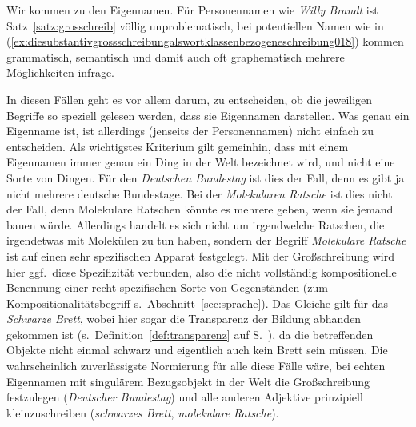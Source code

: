 Wir kommen zu den Eigennamen.
Für Personennamen wie \textit{Willy Brandt} ist Satz~\ref{satz:grosschreib} völlig unproblematisch, bei potentiellen Namen wie in (\ref{ex:diesubstantivgrossschreibungalswortklassenbezogeneschreibung018}) kommen grammatisch, semantisch und damit auch oft graphematisch mehrere Möglichkeiten infrage.

\begin{exe}
  \ex\label{ex:diesubstantivgrossschreibungalswortklassenbezogeneschreibung018}
  \begin{xlist}
  \end{xlist}
\end{exe}

In diesen Fällen geht es vor allem darum, zu entscheiden, ob die jeweiligen Begriffe so speziell gelesen werden, dass sie Eigennamen darstellen.
Was genau ein Eigenname ist, ist allerdings (jenseits der Personennamen) nicht einfach zu entscheiden.
Als wichtigstes Kriterium gilt gemeinhin, dass mit einem Eigennamen immer genau ein Ding in der Welt bezeichnet wird, und nicht eine Sorte von Dingen.
Für den \textit{Deutschen Bundestag} ist dies der Fall, denn es gibt ja nicht mehrere deutsche Bundestage.
Bei der \textit{Molekularen Ratsche} ist dies nicht der Fall, denn Molekulare Ratschen könnte es mehrere geben, wenn sie jemand bauen würde.
Allerdings handelt es sich nicht um irgendwelche Ratschen, die irgendetwas mit Molekülen zu tun haben, sondern der Begriff \textit{Molekulare Ratsche} ist auf einen sehr spezifischen Apparat festgelegt.
Mit der Großschreibung wird hier ggf.\ diese Spezifizität verbunden, also die nicht vollständig kompositionelle Benennung einer recht spezifischen Sorte von Gegenständen (zum Kompositionalitätsbegriff s.\ Abschnitt~\ref{sec:sprache}).
Das Gleiche gilt für das \textit{Schwarze Brett}, wobei hier sogar die Transparenz der Bildung abhanden gekommen ist (s.\ Definition~\ref{def:transparenz} auf S.~\pageref{def:transparenz}), da die betreffenden Objekte nicht einmal schwarz und eigentlich auch kein Brett sein müssen.
Die wahrscheinlich zuverlässigste Normierung für alle diese Fälle wäre, bei echten Eigennamen mit singulärem Bezugsobjekt in der Welt die Großschreibung festzulegen (\textit{Deutscher Bundestag}) und alle anderen Adjektive prinzipiell kleinzuschreiben (\textit{schwarzes Brett}, \textit{molekulare Ratsche}).


